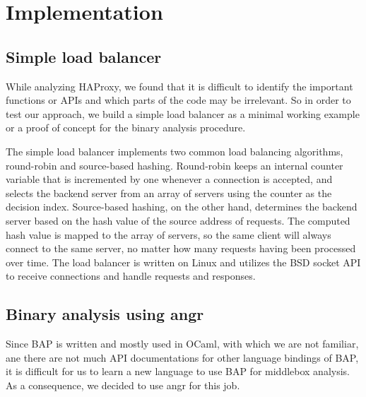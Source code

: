 \section{Implementation}

\subsection{Simple load balancer}

While analyzing HAProxy, we found that it is difficult to identify the important
functions or APIs and which parts of the code may be irrelevant. So in order to
test our approach, we build a simple load balancer as a minimal working example
or a proof of concept for the binary analysis procedure.

The simple load balancer implements two common load balancing algorithms,
round-robin and source-based hashing. Round-robin keeps an internal counter
variable that is incremented by one whenever a connection is accepted, and
selects the backend server from an array of servers using the counter as the
decision index.  Source-based hashing, on the other hand, determines the backend
server based on the hash value of the source address of requests. The computed
hash value is mapped to the array of servers, so the same client will always
connect to the same server, no matter how many requests having been processed
over time. The load balancer is written on Linux and utilizes the BSD socket API
to receive connections and handle requests and responses.


\subsection{Binary analysis using angr}

Since BAP is written and mostly used in OCaml, with which we are not familiar,
ane there are not much API documentations for other language bindings of BAP, it
is difficult for us to learn a new language to use BAP for middlebox analysis.
As a consequence, we decided to use angr for this job.

